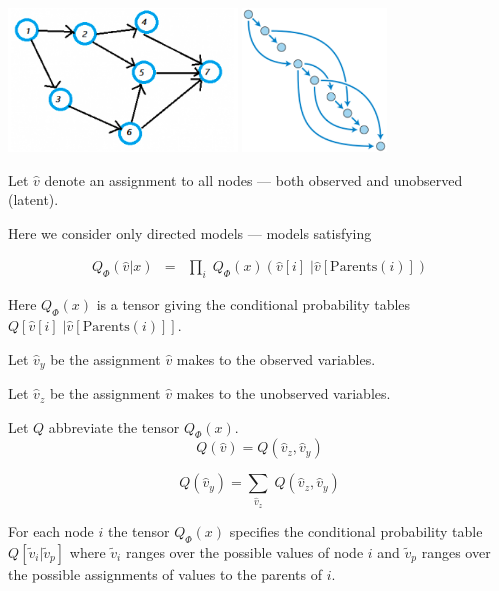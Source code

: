 {\centerline{\includegraphics[height=1.5in]{../images/DAG} \hspace{1in} \includegraphics[height=1.5in]{../images/SortedDAG}}

\vfill
Let $\hat{v}$ denote an assignment to all nodes --- both observed and unobserved (latent).

\vfill
Here we consider only directed models --- models satisfying

\vfill
\begin{eqnarray*}
  Q_\Phi(\hat{v}|x) & = & \prod_{i} \; Q_\Phi(x)(\hat{v}[i]\;| \hat{v}[\mathrm{Parents}(i)])
\end{eqnarray*}

\vfill
Here $Q_\Phi(x)$ is a tensor giving the conditional probability tables $Q[\hat{v}[i]\;| \hat{v}[\mathrm{Parents}(i)]]$.


Let $\hat{v}_y$ be the assignment $\hat{v}$ makes to the observed variables.

\vfill
Let $\hat{v}_z$ be the assignment $\hat{v}$ makes to the unobserved variables.

\vfill
Let $Q$ abbreviate the tensor $Q_\Phi(x)$.
\vfill
$$Q(\hat{v}) = Q(\hat{v}_z,\hat{v}_y)$$

\vfill
$$Q(\hat{v}_y) = \sum_{\hat{v}_z}\;Q(\hat{v}_z,\hat{v}_y)$$


For each node $i$ the tensor $Q_\Phi(x)$ specifies the conditional probability table $Q[\tilde{v}_i|\tilde{v}_p]$ where $\tilde{v}_i$ ranges over the possible values of node $i$
and $\tilde{v}_p$ ranges over the possible assignments of values to the parents of $i$.

}
